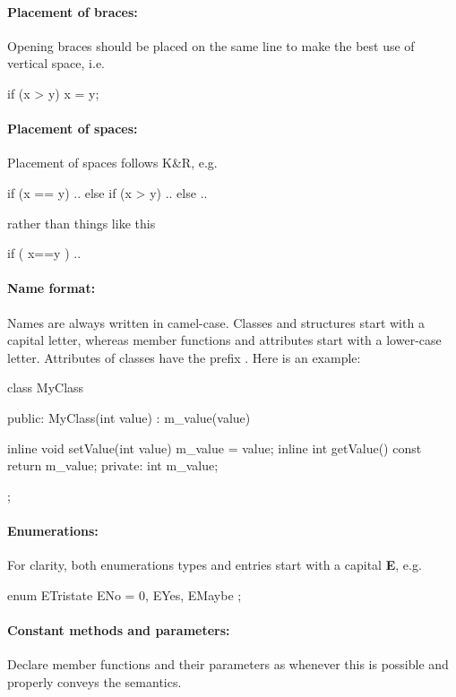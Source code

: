 \paragraph{Placement of braces:} Opening braces should be placed on the
same line to make the best use of vertical space, i.e.
\begin{cpp}
if (x > y) {
    x = y;
}
\end{cpp}

\paragraph{Placement of spaces:} Placement of spaces follows K\&R, e.g.
\begin{cpp}
if (x == y) {
    ..
} else if (x > y) {
    ..
} else {
    ..
}
\end{cpp}
rather than things like this
\begin{cpp}
if ( x==y ){
}
..
\end{cpp}

\paragraph{Name format:} Names are always written in camel-case.
Classes and structures start with a capital letter, whereas member functions
and attributes start with a lower-case letter. Attributes of classes
have the prefix . Here is an example:
\begin{cpp}
class MyClass {
public:
    MyClass(int value) : m_value(value) { }

    inline void setValue(int value) { m_value = value; }
    inline int getValue() const { return m_value; }
private:
    int m_value;
};
\end{cpp}

\paragraph{Enumerations:} For clarity, both enumerations types and entries
start with a capital \textbf{E}, e.g.
\begin{cpp}
enum ETristate {
    ENo = 0,
    EYes,
    EMaybe
};
\end{cpp}
\paragraph{Constant methods and parameters:} Declare member functions and
their parameters as  whenever this is possible
and properly conveys the semantics.

